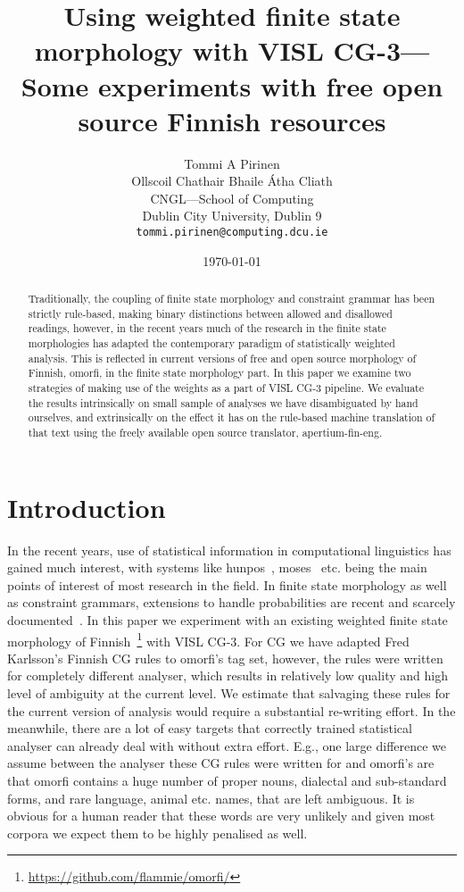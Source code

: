 \documentclass[11pt]{article}
\title{Using weighted finite state morphology with VISL CG-3---Some experiments
    with free open source Finnish resources}
\author{Tommi A Pirinen\\
Ollscoil Chathair Bhaile Átha Cliath\\
CNGL---School of Computing\\
Dublin City University, Dublin 9\\
{\tt tommi.pirinen@computing.dcu.ie}
}
\date{\today}
\begin{document}
\maketitle
\begin{abstract}
    Traditionally, the coupling of finite state morphology and constraint
    grammar has been strictly  rule-based, making binary distinctions
    between allowed and disallowed readings, however, in the recent years much
    of the research in the finite state morphologies has adapted the
    contemporary paradigm of statistically weighted analysis. This is reflected
    in current versions of free and open source morphology of Finnish, omorfi, in
    the finite state morphology part. In this paper we examine two strategies
    of making use of the weights as a part of VISL CG-3 pipeline.
    We evaluate the results intrinsically on small sample of analyses we
    have disambiguated by hand ourselves, and extrinsically on the effect it
    has on the rule-based machine translation of that text using the freely
    available open source translator, apertium-fin-eng. 
\end{abstract}

\section{Introduction}

In the recent years, use of statistical information in computational
linguistics has gained much interest, with systems like hunpos~\cite{hunpos},
moses~\cite{moses} etc.
being the main points of interest of most research in the field. In finite
state morphology as well as constraint grammars, extensions to handle
probabilities are recent and scarcely
documented~\cite{pirinen2009weighting,bick2009introducing}.  In this paper we
experiment with an existing weighted finite state morphology of
Finnish~\cite{pirinen2011modularisation}\footnote{\url{https://github.com/flammie/omorfi/}}
with VISL CG-3. For CG we have adapted Fred Karlsson's Finnish CG rules to
omorfi's tag set, however, the rules were written for completely different
analyser, which results in relatively low quality and high level of ambiguity
at the current level. We estimate that salvaging these rules for the current
version of analysis would require a substantial re-writing effort. In the
meanwhile, there are a lot of easy targets that correctly trained statistical
analyser can already deal with without extra effort. E.g., one large 
difference we assume between the analyser these CG rules were written for and
omorfi's are that omorfi contains a huge number of proper nouns, dialectal
and sub-standard forms, and rare language, animal etc. names, that are left
ambiguous. It is obvious for a human reader that these words are very
unlikely and given most corpora we expect them to be highly penalised as
well.
\end{document}

